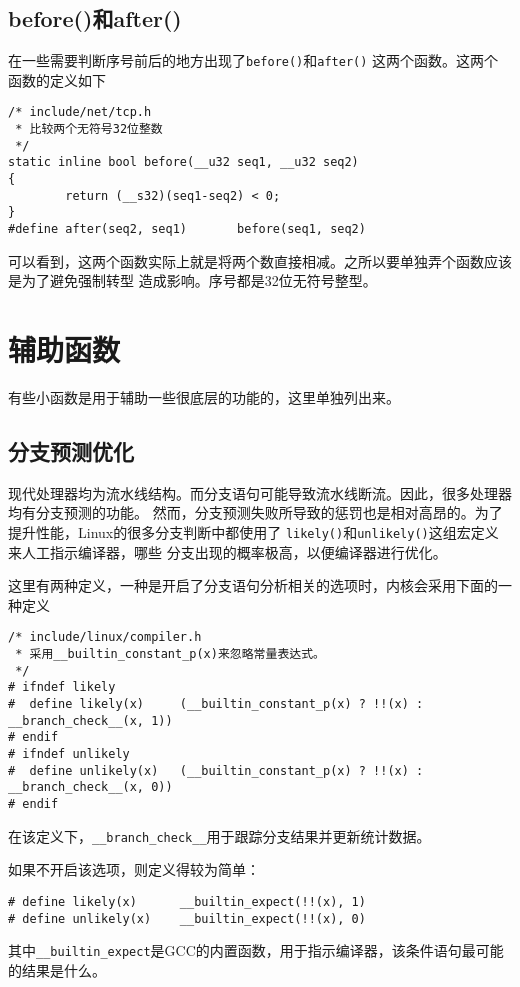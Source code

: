 \subsection{before()和after()}
在一些需要判断序号前后的地方出现了\texttt{before()}和\texttt{after()}
这两个函数。这两个函数的定义如下
\begin{verbatim}
/* include/net/tcp.h
 * 比较两个无符号32位整数
 */
static inline bool before(__u32 seq1, __u32 seq2)
{
        return (__s32)(seq1-seq2) < 0;
}
#define after(seq2, seq1)       before(seq1, seq2)
\end{verbatim}
可以看到，这两个函数实际上就是将两个数直接相减。之所以要单独弄个函数应该是为了避免强制转型
造成影响。序号都是32位无符号整型。

\section{辅助函数}
有些小函数是用于辅助一些很底层的功能的，这里单独列出来。

\subsection{分支预测优化}
现代处理器均为流水线结构。而分支语句可能导致流水线断流。因此，很多处理器均有分支预测的功能。
然而，分支预测失败所导致的惩罚也是相对高昂的。为了提升性能，Linux的很多分支判断中都使用了
\texttt{likely()}和\texttt{unlikely()}这组宏定义来人工指示编译器，哪些
分支出现的概率极高，以便编译器进行优化。

这里有两种定义，一种是开启了分支语句分析相关的选项时，内核会采用下面的一种定义
\begin{verbatim}
/* include/linux/compiler.h
 * 采用__builtin_constant_p(x)来忽略常量表达式。
 */
# ifndef likely
#  define likely(x)     (__builtin_constant_p(x) ? !!(x) : __branch_check__(x, 1))
# endif
# ifndef unlikely
#  define unlikely(x)   (__builtin_constant_p(x) ? !!(x) : __branch_check__(x, 0))
# endif
\end{verbatim}
在该定义下，\texttt{__branch_check__}用于跟踪分支结果并更新统计数据。

如果不开启该选项，则定义得较为简单：
\begin{verbatim}
# define likely(x)      __builtin_expect(!!(x), 1)
# define unlikely(x)    __builtin_expect(!!(x), 0)
\end{verbatim}
其中\texttt{__builtin_expect}是GCC的内置函数，用于指示编译器，该条件语句最可能的结果是什么。

